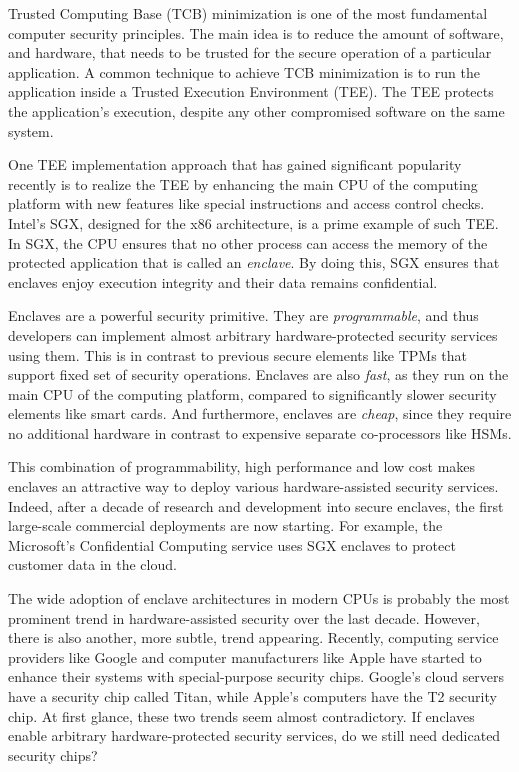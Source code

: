 
\vspace{10pt}

Trusted Computing Base (TCB) minimization is one of the most fundamental computer security principles. The main idea is to reduce the amount of software, and hardware, that needs to be trusted for the secure operation of a particular application. A common technique to achieve TCB minimization is to run the application inside a Trusted Execution Environment (TEE). The TEE protects the application's execution, despite any other compromised software on the same system.

One TEE implementation approach that has gained significant popularity recently is to realize the TEE by enhancing the main CPU of the computing platform with new features like special instructions and access control checks. Intel's SGX, designed for the x86 architecture, is a prime example of such TEE. In SGX, the CPU ensures that no other process can access the memory of the protected application that is called an \emph{enclave}. By doing this, SGX ensures that enclaves enjoy execution integrity and their data remains confidential.  

Enclaves are a powerful security primitive. They are \emph{programmable}, and thus developers can implement almost arbitrary hardware-protected security services using them. This is in contrast to previous secure elements like TPMs that support fixed set of security operations. Enclaves are also \emph{fast}, as they run on the main CPU of the computing platform, compared to significantly slower security elements like smart cards. And furthermore, enclaves are \emph{cheap}, since they require no additional hardware in contrast to expensive separate co-processors like HSMs. 

This combination of programmability, high performance and low cost makes enclaves an attractive way to deploy various hardware-assisted security services. Indeed, after a decade of research and development into secure enclaves, the first large-scale commercial deployments are now starting. For example, the Microsoft's Confidential Computing service uses SGX enclaves to protect customer data in the cloud.%

The wide adoption of enclave architectures in modern CPUs is probably the most prominent trend in hardware-assisted security over the last decade. However, there is also another, more subtle, trend appearing. Recently, computing service providers like Google and computer manufacturers like Apple have started to enhance their systems with special-purpose security chips. Google's cloud servers have a security chip called Titan, while Apple's computers have the T2 security chip. At first glance, these two trends seem almost contradictory. If enclaves enable arbitrary hardware-protected security services, do we still need dedicated security chips? 

